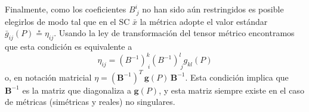 Finalmente, como los coeficientes $B^i_{\ j}$ no han sido aún restringidos es posible elegirlos de modo tal que en el SC $\bar{x}$ la métrica adopte el valor estándar $\bar{g}_{ij}(P)\stackrel{*}{=}\eta_{ij}$. Usando la ley de transformación del tensor métrico encontramos que esta condición es equivalente a
\begin{equation}
\eta_{ij}=(B^{-1})^k_{\ i}(B^{-1})^l_{\ j}g_{kl}(P)
\end{equation}
o, en notación matricial $\eta=(\mathbf{B}^{-1})^T\,\mathbf{g}(P)\,\mathbf{B}^{-1}$.
Esta condición implica que $\mathbf{B}^{-1}$ es la matriz que diagonaliza a $\mathbf{g}(P)$, y esta matriz siempre existe en el caso de métricas (simétricas y reales) no singulares.
%
%
%
